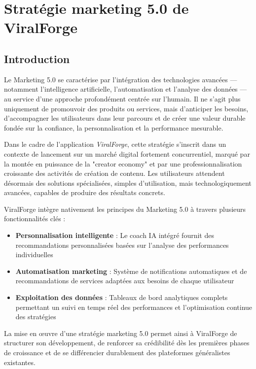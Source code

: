\chapter{Stratégie marketing 5.0 de ViralForge}

\label{chap:Stratégie marketing 5.0 de ViralForge}

\section*{Introduction}

Le Marketing 5.0 se caractérise par l'intégration des technologies avancées — notamment l'intelligence artificielle, l'automatisation et l'analyse des données — au service d'une approche profondément centrée sur l'humain. Il ne s'agit plus uniquement de promouvoir des produits ou services, mais d'anticiper les besoins, d'accompagner les utilisateurs dans leur parcours et de créer une valeur durable fondée sur la confiance, la personnalisation et la performance mesurable.

Dans le cadre de l'application \textit{ViralForge}, cette stratégie s'inscrit dans un contexte de lancement sur un marché digital fortement concurrentiel, marqué par la montée en puissance de la "creator economy" et par une professionnalisation croissante des activités de création de contenu. Les utilisateurs attendent désormais des solutions spécialisées, simples d'utilisation, mais technologiquement avancées, capables de produire des résultats concrets.

ViralForge intègre nativement les principes du Marketing 5.0 à travers plusieurs fonctionnalités clés :
\begin{itemize}
    \item \textbf{Personnalisation intelligente} : Le coach IA intégré fournit des recommandations personnalisées basées sur l'analyse des performances individuelles
    \item \textbf{Automatisation marketing} : Système de notifications automatiques et de recommandations de services adaptées aux besoins de chaque utilisateur
    \item \textbf{Exploitation des données} : Tableaux de bord analytiques complets permettant un suivi en temps réel des performances et l'optimisation continue des stratégies
\end{itemize}

La mise en œuvre d'une stratégie marketing 5.0 permet ainsi à ViralForge de structurer son développement, de renforcer sa crédibilité dès les premières phases de croissance et de se différencier durablement des plateformes généralistes existantes.

